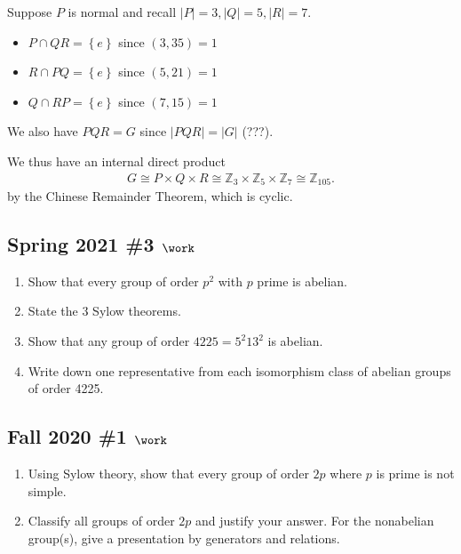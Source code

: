 \begin{solution}
Suppose \(P\) is normal and recall
\({\left\lvert {P} \right\rvert} = 3, {\left\lvert {Q} \right\rvert} = 5, {\left\lvert {R} \right\rvert} = 7\).

\begin{itemize}
\tightlist
\item
  \(P\cap QR = \left\{{e}\right\}\) since \((3, 35) = 1\)
\item
  \(R\cap PQ = \left\{{e}\right\}\) since \((5, 21) = 1\)
\item
  \(Q\cap RP = \left\{{e}\right\}\) since \((7, 15) = 1\)
\end{itemize}

We also have \(PQR = G\) since
\({\left\lvert {PQR} \right\rvert} = {\left\lvert {G} \right\rvert}\)
(???).

We thus have an internal direct product
\begin{align*}
G \cong P\times Q \times R \cong {\mathbb{Z}}_3 \times{\mathbb{Z}}_5 \times{\mathbb{Z}}_7 \cong {\mathbb{Z}}_{105}
.\end{align*}
by the Chinese Remainder Theorem, which is cyclic.

\end{solution}

\hypertarget{spring-2021-3-work}{%
\subsection{\texorpdfstring{Spring 2021 \#3
\(\work\)}{Spring 2021 \#3 \textbackslash work}}\label{spring-2021-3-work}}

\begin{enumerate}
\def\labelenumi{\alph{enumi}.}
\item
  Show that every group of order \(p^2\) with \(p\) prime is abelian.
\item
  State the 3 Sylow theorems.
\item
  Show that any group of order \(4225 = 5^2 13^2\) is abelian.
\item
  Write down one representative from each isomorphism class of abelian
  groups of order 4225.
\end{enumerate}

\hypertarget{fall-2020-1-work}{%
\subsection{\texorpdfstring{Fall 2020 \#1
\(\work\)}{Fall 2020 \#1 \textbackslash work}}\label{fall-2020-1-work}}

\begin{enumerate}
\def\labelenumi{\alph{enumi}.}
\item
  Using Sylow theory, show that every group of order \(2p\) where \(p\)
  is prime is not simple.
\item
  Classify all groups of order \(2p\) and justify your answer. For the
  nonabelian group(s), give a presentation by generators and relations.
\end{enumerate}

